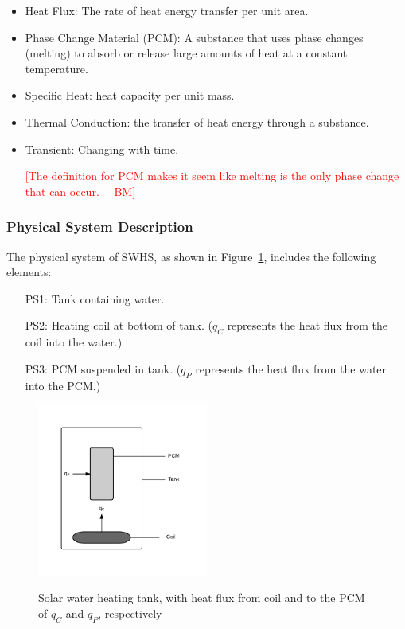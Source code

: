 \documentclass[12pt]{article}
\newcommand{\authornote}[3]{\textcolor{#1}{[#3 ---#2]}}
\newcommand{\authornote}[3]{}
\newcommand{\bmac}[1]{\authornote{red}{BM}{#1}}
\newcommand{\progname}{SWHS}
\begin{document}
\begin{itemize}

\item Heat Flux: The rate of heat energy transfer per unit area.

\item Phase Change Material (PCM): A substance that uses phase changes (melting)
  to absorb or release large amounts of heat at a constant temperature.

\item Specific Heat: heat capacity per unit mass.

\item Thermal Conduction: the transfer of heat energy through a substance.

\item Transient: Changing with time.

\bmac{The definition for PCM makes it seem like melting is the only phase change that can occur.}

\end{itemize}

\subsubsection{Physical System Description}

The physical system of \progname{}, as shown in Figure~\ref{Fig_Tank},
includes the following elements:

\begin{itemize}

\item[PS1:] Tank containing water.

\item[PS2:] Heating coil at bottom of tank.  ($q_C$ represents the heat flux
  from the coil into the water.)

\item[PS3:] PCM suspended in tank.  ($q_P$ represents
  the heat flux from the water into the PCM.)

\end{itemize}

\begin{figure}[h!]
\begin{center}
{
 \includegraphics[width=0.5\textwidth]{Tank.png}
}
\caption{\label{Fig_Tank} Solar water heating tank, with heat flux from coil 
and to the PCM of $q_C$ and $q_P$, respectively}
\end{center}
\end{figure}
\end{document}
